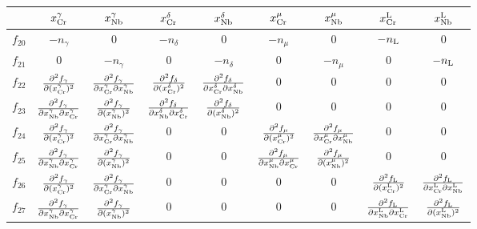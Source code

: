 \documentclass[10pt]{article}
\begin{document}
		\begin{small}
		\begin{tabular}{|c|cccccccc|}\hline
		  & $x_{\ce{Cr}}^{\gamma}$ & $x_{\ce{Nb}}^{\gamma}$ & $x_{\ce{Cr}}^{\delta}$ & $x_{\ce{Nb}}^{\delta}$
		  & $x_{\ce{Cr}}^{\mu}$ & $x_{\ce{Nb}}^{\mu}$ & $x_{\ce{Cr}}^{\ce{L}}$ & $x_{\ce{Nb}}^{\ce{L}}$\\\hline
		$f_{20}$ & $-n_{\gamma}$ & 0 & $-n_{\delta}$ & 0 & $-n_{\mu}$ & 0 & $-n_{\ce{L}}$ & 0\\
		$f_{21}$ & 0 & $-n_{\gamma}$ & 0 & $-n_{\delta}$ & 0 & $-n_{\mu}$ & 0 & $-n_{\ce{L}}$\\
		$f_{22}$ & $\frac{\partial^2 f_{\gamma}}{\partial(x_{\ce{Cr}}^{\gamma})^2}$ & $\frac{\partial^2 f_{\gamma}}{\partial x_{\ce{Cr}}^{\gamma}\partial x_{\ce{Nb}}^{\gamma}}$ 
		& $\frac{\partial^2 f_{\delta}}{\partial(x_{\ce{Cr}}^{\delta})^2}$ & $\frac{\partial^2 f_{\delta}}{\partial x_{\ce{Cr}}^{\delta}\partial x_{\ce{Nb}}^{\delta}}$
		& 0 & 0 & 0 & 0\\
		$f_{23}$ & $\frac{\partial^2 f_{\gamma}}{\partial x_{\ce{Nb}}^{\gamma}\partial x_{\ce{Cr}}^{\gamma}}$ & $\frac{\partial^2 f_{\gamma}}{\partial(x_{\ce{Nb}}^{\gamma})^2}$
		& $\frac{\partial^2 f_{\delta}}{\partial x_{\ce{Nb}}^{\delta} \partial x_{\ce{Cr}}^{\delta}}$ & $\frac{\partial^2 f_{\delta}}{\partial(x_{\ce{Nb}}^{\delta})^2}$
		& 0 & 0 & 0 & 0\\
		$f_{24}$ & $\frac{\partial^2 f_{\gamma}}{\partial(x_{\ce{Cr}}^{\gamma})^2}$ & $\frac{\partial^2 f_{\gamma}}{\partial x_{\ce{Cr}}^{\gamma}\partial x_{\ce{Nb}}^{\gamma}}$ 
		& 0 & 0 & $\frac{\partial^2 f_{\mu}}{\partial(x_{\ce{Cr}}^{\mu})^2}$ & $\frac{\partial^2 f_{\mu}}{\partial x_{\ce{Cr}}^{\mu}\partial x_{\ce{Nb}}^{\mu}}$
		& 0 & 0\\
		$f_{25}$ & $\frac{\partial^2 f_{\gamma}}{\partial x_{\ce{Nb}}^{\gamma}\partial x_{\ce{Cr}}^{\gamma}}$ & $\frac{\partial^2 f_{\gamma}}{\partial(x_{\ce{Nb}}^{\gamma})^2}$
		& 0 & 0 & $\frac{\partial^2 f_{\mu}}{\partial x_{\ce{Nb}}^{\mu} \partial x_{\ce{Cr}}^{\mu}}$ & $\frac{\partial^2 f_{\mu}}{\partial(x_{\ce{Nb}}^{\mu})^2}$
		& 0 & 0\\
		$f_{26}$ & $\frac{\partial^2 f_{\gamma}}{\partial(x_{\ce{Cr}}^{\gamma})^2}$ & $\frac{\partial^2 f_{\gamma}}{\partial x_{\ce{Cr}}^{\gamma}\partial x_{\ce{Nb}}^{\gamma}}$ 
		& 0 & 0 & 0 & 0 & $\frac{\partial^2 f_{\ce{L}}}{\partial(x_{\ce{Cr}}^{\ce{L}})^2}$ & $\frac{\partial^2 f_{\ce{L}}}{\partial x_{\ce{Cr}}^{\ce{L}}\partial x_{\ce{Nb}}^{\ce{L}}}$
		\\
		$f_{27}$ & $\frac{\partial^2 f_{\gamma}}{\partial x_{\ce{Nb}}^{\gamma}\partial x_{\ce{Cr}}^{\gamma}}$ & $\frac{\partial^2 f_{\gamma}}{\partial(x_{\ce{Nb}}^{\gamma})^2}$
		& 0 & 0 & 0 & 0 & $\frac{\partial^2 f_{\ce{L}}}{\partial x_{\ce{Nb}}^{\ce{L}} \partial x_{\ce{Cr}}^{\ce{L}}}$ & $\frac{\partial^2 f_{\ce{L}}}{\partial(x_{\ce{Nb}}^{\ce{L}})^2}$
		\\\hline
		\end{tabular}
		\end{small}
	
\end{document}

